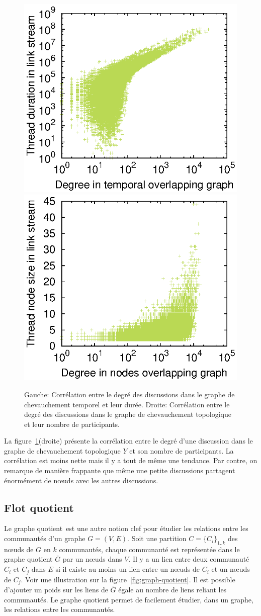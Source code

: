\begin{figure}
\centering
	\includegraphics[width=0.49\linewidth]{img/mailing/degree_temp}
	\hfill
	\includegraphics[width=0.49\linewidth]{img/mailing/degree_nodes}
	\caption{Gauche: Corrélation entre le degré des discussions dans le graphe de chevauchement temporel et leur durée. Droite: Corrélation entre le degré des discussions dans le graphe de chevauchement topologique et leur nombre de participants.}
	\label{fig:x-y-graphs_discu}
\end{figure}

La figure~\ref{fig:x-y-graphs_discu}(droite) présente la corrélation entre le degré d'une discussion dans le graphe de chevauchement topologique $Y$ et son nombre de participants.
La corrélation est moins nette mais il y a tout de même une tendance.
Par contre, on remarque de manière frappante que même une petite discussions partagent énormément de n\oe uds avec les autres discussions.


\subsection{Flot quotient}

Le graphe quotient\REF\ est une autre notion clef pour étudier les relations entre les communautés d'un graphe $G=(V,E)$.
Soit une partition $C= \{C_i\}_{1 .. k}$ des n\oe uds de $G$ en $k$ communautés, chaque communauté est représentée dans le graphe quotient $\bar{G}$ par un n\oe uds dans $V$.
Il y a un lien entre deux communauté $C_i$ et $C_j$ dans $E$ si il existe au moins un lien entre un n\oe uds de $C_i$ et un n\oe uds de $C_j$.
Voir une illustration sur la figure~\ref{fig:graph-quotient}.
Il est possible d'ajouter un poids sur les liens de $\bar{G}$ égale au nombre de liens reliant les communautés.
Le graphe quotient permet de facilement étudier, dans un graphe, les relations entre les communautés.

